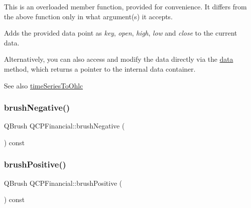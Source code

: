 This is an overloaded member function, provided for convenience. It differs from the above function only in what argument(s) it accepts.

Adds the provided data point as {\itshape key}, {\itshape open}, {\itshape high}, {\itshape low} and {\itshape close} to the current data.

Alternatively, you can also access and modify the data directly via the \mbox{\hyperlink{class_q_c_p_financial_aec3f666271cf48bd7b87d84fe3f8c074}{data}} method, which returns a pointer to the internal data container.

\begin{DoxySeeAlso}{See also}
\mbox{\hyperlink{class_q_c_p_financial_a9a058c035040d3939b8884f4aaccb1a7}{time\+Series\+To\+Ohlc}} 
\end{DoxySeeAlso}
\mbox{\label{class_q_c_p_financial_ad4fdc5bc21f5eb17070e043bd4a35f53}} 
\subsubsection{\texorpdfstring{brushNegative()}{brushNegative()}}
{\footnotesize\ttfamily Q\+Brush Q\+C\+P\+Financial\+::brush\+Negative (\begin{DoxyParamCaption}{ }\end{DoxyParamCaption}) const\hspace{0.3cm}{\ttfamily [inline]}}

\mbox{\label{class_q_c_p_financial_ae922e75f3d5b8854369ac0bf1ebfb053}} 
\subsubsection{\texorpdfstring{brushPositive()}{brushPositive()}}
{\footnotesize\ttfamily Q\+Brush Q\+C\+P\+Financial\+::brush\+Positive (\begin{DoxyParamCaption}{ }\end{DoxyParamCaption}) const\hspace{0.3cm}{\ttfamily [inline]}}

\mbox{\label{class_q_c_p_financial_a9783e91a33fd08a402b1a3821d43e471}} 
